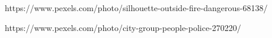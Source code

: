 https://www.pexels.com/photo/silhouette-outside-fire-dangerous-68138/

https://www.pexels.com/photo/city-group-people-police-270220/